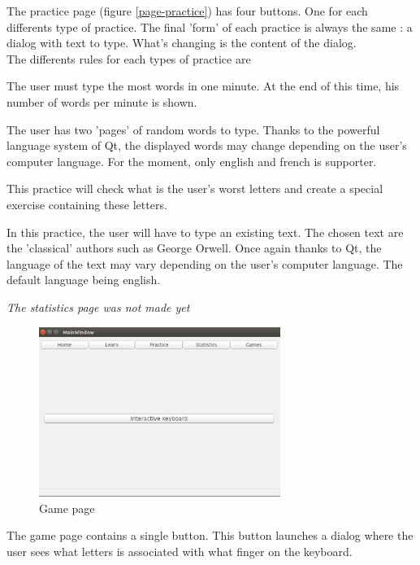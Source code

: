 The practice page  (figure \ref{page-practice}) has four buttons. One for each differents type of practice. The final 'form' of each practice is always the same : a dialog with text to type. What's changing is the content of the dialog.\\
The differents rules for each types of practice are 
\begin{description}[align=left]
	\item[Against time :] The user must type the most words in one minute. At the end of this time, his number of words per minute is shown.
	\item[Normal :] The user has two 'pages' of random words to type. Thanks to the powerful language system of Qt, the displayed words may change depending on the user's computer language. For the moment, only english and french is supporter.
	\item[Improve :] This practice will check what is the user's worst letters and create a special exercise containing these letters.
	\item[Text :] In this practice, the user will have to type an existing text. The chosen text are the 'classical' authors such as George Orwell. Once again thanks to Qt, the language of the text may vary depending on the user's computer language. The default language being english. 
\end{description}

\textit{The statistics page was not made yet}

\begin{figure}[H]
	\centering
	\includegraphics[width=0.7\textwidth]{images/page-games.png}
	 \caption{Game page}
	 \label{page-game}
\end{figure}

The game page contains a single button. This button launches a dialog where the user sees what letters is associated with what finger on the keyboard.

